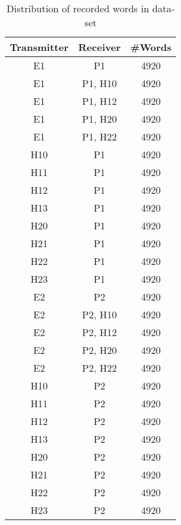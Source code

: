 \documentclass[conference]{IEEEtran}
\begin{document}
  
  \begin{table}
    \caption{Distribution of recorded words in data-set}
    \label{tab:RecordingsSummery}
    \centering
    \begin{tabular}{|c c c|} 
      \hline
      Transmitter & Receiver & \#Words \\ [0.5ex] 
      \hline\hline
      E1 & P1 & 4920 \\ %
      \hline
      E1 & P1, H10 & 4920 \\
      \hline
      E1 & P1, H12 & 4920 \\
      \hline
      E1 & P1, H20 & 4920 \\
      \hline
      E1 & P1, H22 & 4920 \\
      \hline
      H10 & P1 & 4920 \\
      \hline
      H11 & P1 & 4920 \\
      \hline
      H12 & P1 & 4920 \\
      \hline
      H13 & P1 & 4920 \\
      \hline
      H20 & P1 & 4920 \\
      \hline
      H21 & P1 & 4920 \\
      \hline
      H22 & P1 & 4920 \\
      \hline
      H23 & P1 & 4920 \\
      \hline
      E2 & P2 & 4920 \\ %
      \hline
      E2 & P2, H10 & 4920 \\
      \hline
      E2 & P2, H12 & 4920 \\
      \hline
      E2 & P2, H20 & 4920 \\
      \hline
      E2 & P2, H22 & 4920 \\
      \hline
      H10 & P2 & 4920 \\
      \hline
      H11 & P2 & 4920 \\
      \hline
      H12 & P2 & 4920 \\
      \hline
      H13 & P2 & 4920 \\
      \hline
      H20 & P2 & 4920 \\
      \hline
      H21 & P2 & 4920 \\
      \hline
      H22 & P2 & 4920 \\
      \hline
      H23 & P2 & 4920 \\
      \hline
    \end{tabular}
  \end{table}
  
\end{document}
